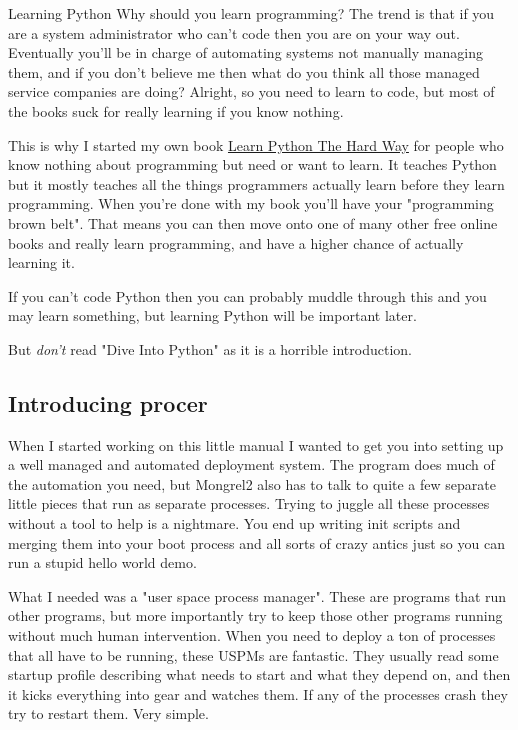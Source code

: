 \begin{aside}{Learning Python}
Why should you learn programming?  The trend is that if you are a system administrator
who can't code then you are on your way out.  Eventually you'll be in charge of automating
systems not manually managing them, and if you don't believe me then what do you think all
those managed service companies are doing?  Alright, so you need to learn to code, but
most of the books suck for really learning if you know nothing.

This is why I started my own book \href{http://learnpythonthehardway.org}{Learn
Python The Hard Way}  for people who know nothing about programming but need or
want to learn.  It teaches Python but it mostly teaches all the things
programmers actually learn before they learn programming.  When you're done
with my book you'll have your "programming brown belt".  That means you can
then move onto one of many other free online books and really learn
programming, and have a higher chance of actually learning it.

If you can't code Python then you can probably muddle through this and you may
learn something, but learning Python will be important later.

But \emph{don't} read "Dive Into Python" as it is a horrible introduction.
\end{aside}

\subsection{Introducing procer}

When I started working on this little manual I wanted to get you into setting up
a well managed and automated deployment system.  The  program does 
much of the automation you need, but Mongrel2 also has to talk to quite a few 
separate little pieces that run as separate processes.  Trying to juggle all these
processes without a tool to help is a nightmare.  You end up writing init scripts
and merging them into your boot process and all sorts of crazy antics just so you
can run a stupid hello world demo.

What I needed was a "user space process manager".  These are programs that run other
programs, but more importantly try to keep those other programs running without much
human intervention.  When you need to deploy a ton of processes that all have to
be running, these USPMs are fantastic.  They usually read some startup profile describing
what needs to start and what they depend on, and then it kicks everything into gear
and watches them.  If any of the processes crash they try to restart them.  Very simple.

